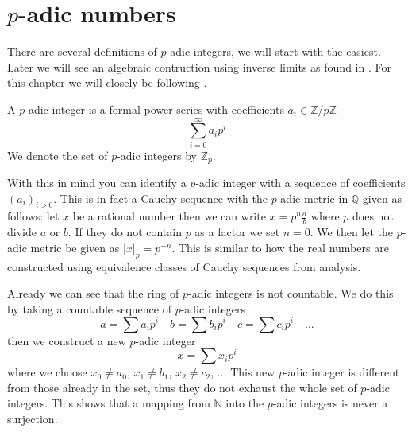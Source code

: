 \section{$p$-adic numbers} \label{p-adic}
There are several definitions of $p$-adic integers, we will start with the easiest. Later we
will see an algebraic contruction using inverse limits as found in \cite{Rotman}. For this
chapter we will closely be following \cite{Robert}.
\begin{mydef}
 A $p$-adic integer is a formal power series with coefficients $a_i \in \mathbb{Z}/p\mathbb{Z}$
$$ \sum_{i=0}^{\infty} a_i p^i $$
We denote the set of $p$-adic integers by $\mathbb{Z}_p$.
\end{mydef}
With this in mind you can identify a $p$-adic integer with a sequence of coefficients
$(a_i)_{i > 0}$. This is in fact a Cauchy sequence with the $p$-adic metric in $\mathbb{Q}$ given as follows:
let $x$ be a rational number then we can write $x = p^n \frac{a}{b}$ where $p$ does not divide $a$ or $b$.
If they do not contain $p$ as a factor we set $n=0$. We then let the $p$-adic metric be given as
$|x|_p = p^{-n}$. This is similar to how the real numbers are constructed using equivalence classes
of Cauchy sequences from analysis.

Already we can see that the ring of $p$-adic integers is not countable. We do this by taking
a countable sequence of $p$-adic integers
$$a = \sum a_i p^i \quad b = \sum b_i p^i \quad c = \sum c_i p^i \quad \ldots $$
then we construct a new $p$-adic integer
$$x = \sum x_i p^i $$
where we choose $x_0 \neq a_0$, $x_1 \neq b_1$, $x_2 \neq c_2$, $\ldots$
This new $p$-adic integer is different from those already in the set, thus they do not
exhaust the whole set of $p$-adic integers. This shows that a mapping from $\mathbb{N}$ into
the $p$-adic integers is never a surjection.

